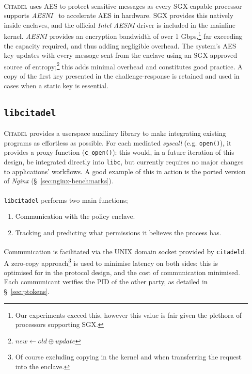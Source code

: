 \paragraph{} \textsc{Citadel} uses AES to protect sensitive messages as every SGX-capable processor supports \textit{AESNI}~\cite{aesni} to accelerate AES in hardware. SGX provides this natively inside enclaves, and the official \textit{Intel AESNI} driver is included in the mainline kernel. \textit{AESNI} provides an encryption bandwidth of over 1 Gbps,\footnote{Our experiments exceed this, however this value is fair given the plethora of processors supporting SGX.} far exceeding the capacity required, and thus adding negligible overhead. The system's AES key updates with every message sent from the enclave using an SGX-approved source of entropy;\footnote{$new \leftarrow old \oplus update$} this adds minimal overhead and constitutes good practice. A copy of the first key presented in the challenge-response is retained and used in cases when a static key is essential.

\subsection{\texttt{libcitadel}}
\label{sec:libcitadel}
\paragraph{} \textsc{Citadel} provides a userspace auxiliary library to make integrating existing programs as effortless as possible. For each mediated \textit{syscall} (e.g. \texttt{open()}), it provides a proxy function (\texttt{c\_open()}): this would, in a future iteration of this design, be integrated directly into \texttt{libc}, but currently requires no major changes to applications' workflows. A good example of this in action is the ported version of \textit{Nginx} (§~\ref{sec:nginx-benchmarks}).

\paragraph{} \texttt{libcitadel} performs two main functions;
\begin{enumerate}
    \item Communication with the policy enclave.
    \item Tracking and predicting what permissions it believes the process has.
\end{enumerate}

\paragraph{} Communication is facilitated via the UNIX domain socket provided by \texttt{citadeld}. A zero-copy approach\footnote{Of course excluding copying in the kernel and when transferring the request into the enclave.} is used to minimise latency on both sides; this is optimised for in the protocol design, and the cost of communication minimised. Each communicant verifies the PID of the other party, as detailed in §~\ref{sec:ptokens}.

